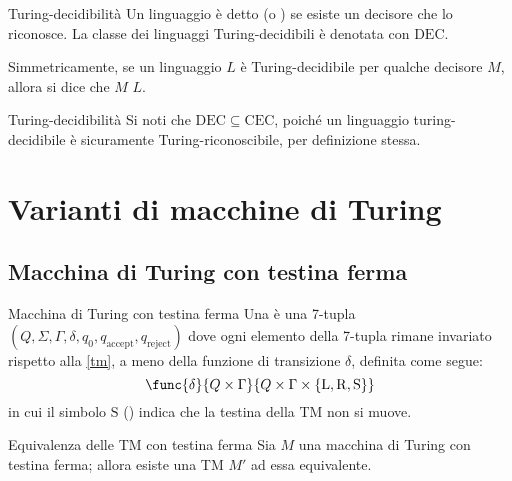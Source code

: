 \documentclass[a4paper, 12pt]{report}
\begin{document}
    \begin{frameddefn}{Turing-decidibilità}
        Un linguaggio è detto  (o ) se esiste un decisore che lo riconosce. La classe dei linguaggi Turing-decidibili è denotata con $\mathrm{DEC}$.

        Simmetricamente, se un linguaggio $L$ è Turing-decidibile per qualche decisore $M$, allora si dice che $M$  $L$.
    \end{frameddefn}

    \begin{framedobs}{Turing-decidibilità}
        Si noti che $\mathrm{DEC} \subseteq \mathrm{CEC}$, poiché un linguaggio turing-decidibile è sicuramente Turing-riconoscibile, per definizione stessa.
    \end{framedobs}

    \section{Varianti di macchine di Turing}

    \subsection{Macchina di Turing con testina ferma}

    \begin{frameddefn}[label={stay tm}]{Macchina di Turing con testina ferma}
        Una  è una 7-tupla $(Q, \Sigma, \Gamma, \delta, q_0, q_\mathrm{accept}, q_\mathrm{reject})$ dove ogni elemento della 7-tupla rimane invariato rispetto alla \cref{tm}, a meno della funzione di transizione $\delta$, definita come segue: $$\func{\delta}{Q \times \Gamma}{Q \times \Gamma \times \{\mathrm L, \mathrm R, \mathrm S\}}$$ in cui il simbolo $\mathrm S$ () indica che la testina della TM non si muove.
    \end{frameddefn}

    \begin{framedprop}[label={stay tm equiv}]{Equivalenza delle TM con testina ferma}
        Sia $M$ una macchina di Turing con testina ferma; allora esiste una TM $M'$ ad essa equivalente.
    \end{framedprop}
\end{document}
